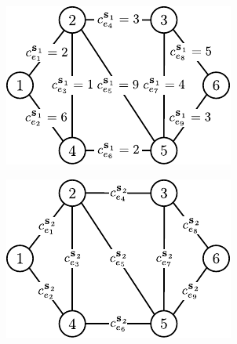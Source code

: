 \begin{figure}[!htbp]
	\null\hfill
	\begin{subfigure}[b]{0.32\textwidth}
		\includegraphics[width=\textwidth]{Chapter_II/SCENARIO-example/a}
		\caption{}
		\label{fig:scenarioExample:a}
	\end{subfigure}
	\hfill
	\begin{subfigure}[b]{0.32\textwidth}
		\includegraphics[width=\textwidth]{Chapter_II/SCENARIO-example/b}
		\caption{}
		\label{fig:scenarioExample:b}
	\end{subfigure}
	\hfill
	\begin{subfigure}[b]{0.32\textwidth}

\end{subfigure}
\end{figure}
